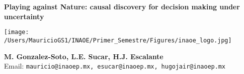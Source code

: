 \documentclass[a0,portrait]{a0poster}
\begin{document}


\begin{minipage}[b]{0.45\linewidth}
\begin{flushleft}
\LARGE \color{NavyBlue} \textbf{Playing against Nature: causal discovery for decision making under uncertainty} \color{Black}\\ %
\end{flushleft}
\end{minipage}
%
\begin{minipage}[b]{0.20\linewidth}
\begin{center}
\texttt{[image: /Users/MauricioGS1/INAOE/Primer\_Semestre/Figures/inaoe\_logo.jpg]}
\end{center}
\end{minipage}
%
\begin{minipage}[b]{0.30\linewidth}
\begin{center}
\large \textbf{M. Gonzalez-Soto, L.E. Sucar, H.J. Escalante}\\ %
Email: \texttt{mauricio@inaoep.mx, esucar@inaoep.mx, hugojair@inaoep.mx}
\end{center}
\end{minipage}

\vspace{0.3cm} %

\end{document}
